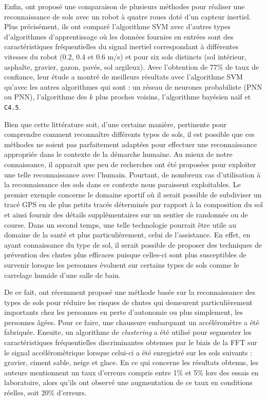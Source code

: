 Enfin, \cite{Weiss2007} ont proposé une comparaison de plusieurs méthodes pour réaliser une reconnaissance de sols avec un robot à quatre roues doté d'un capteur inertiel. Plus précisément, ils ont comparé l'algorithme \acs{SVM} avec d'autres types d'algorithmes d'apprentissage où les données fournies en entrées sont des caractéristiques fréquentielles du signal inertiel correspondant à différentes vitesses du robot (0.2, 0.4 et 0.6 m/s) et pour six sols distincts (sol intérieur, asphalte, gravier, gazon, pavés, sol argileux). Avec l'obtention de 77\% de taux de confiance, leur étude a montré de meilleurs résultats avec l'algorithme \acs{SVM} qu'avec les autres algorithmes qui sont : un réseau de neurones probabiliste (\acl{PNN} ou \acs{PNN}), l'algorithme des $k$ plus proches voisins, l'algorithme bayésien naïf et \texttt{C4.5}.

Bien que cette littérature soit, d'une certaine manière, pertinente pour comprendre comment reconnaître différents types de sols, il est possible que ces méthodes ne soient pas parfaitement adaptées pour effectuer une reconnaissance appropriée dans le contexte de la démarche humaine. Au mieux de notre connaissance, il apparait que peu de recherches ont été proposées pour exploiter une telle reconnaissance avec l'humain. Pourtant, de nombreux cas d'utilisation à la reconnaissance des sols dans ce contexte nous paraissent exploitables. Le premier exemple concerne le domaine sportif où il serait possible de subdiviser un tracé \acs{GPS} en de plus petits tracés déterminés par rapport à la composition du sol et ainsi fournir des détails supplémentaires sur un sentier de randonnée ou de course. Dans un second temps, une telle technologie pourrait être utile au domaine de la santé et plus particulièrement, celui de l'assistance. En effet, en ayant connaissance du type de sol, il serait possible de proposer des techniques de prévention des chutes plus efficaces puisque celles-ci sont plus susceptibles de survenir lorsque les personnes évoluent sur certains types de sols comme le carrelage humide d'une salle de bain.

De ce fait, \cite{Otis2016} ont récemment proposé une méthode basée sur la reconnaissance des types de sols pour réduire les risques de chutes qui demeurent particulièrement importants chez les personnes en perte d'autonomie ou plus simplement, les personnes âgées. Pour ce faire, une chaussure embarquant un accéléromètre a été fabriquée. Ensuite, un algorithme de \textit{clustering} a été utilisé pour segmenter les caractéristiques fréquentielles discriminantes obtenues par le biais de la \acs{FFT} sur le signal accéléromètrique lorsque celui-ci a été enregistré sur les sols suivants : gravier, ciment sable, neige et glace. En ce qui concerne les résultats obtenus, les auteurs mentionnent un taux d'erreurs compris entre 1\% et 5\% lors des essais en laboratoire, alors qu’ils ont observé une augmentation de ce taux en conditions réelles, soit 20\% d'erreurs.

